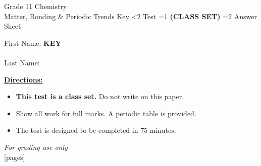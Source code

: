\documentclass[addpoints]{exam}
\newcommand{\event}{Matter, Bonding \& Periodic Trends}
\newcommand{\tournament}{}
\def\type{0}
\begin{document}
\begin{center}
    {\huge Grade 11 Chemistry \\ \event
    \ifprintanswers \space Key
    \else \space \ifnum\type<2 Test \fi \ifnum\type=1 \textbf{(CLASS SET)} \fi
          \ifnum\type=2 Answer Sheet \fi
    \fi \\ \vspace{3mm}\tournament\vspace{1mm}}
\end{center}

\vspace{.25\textheight}

\begin{center}
    First Name: \ifprintanswers
    \underline{\hspace{3.5cm}}\textbf{KEY}\underline{\hspace{5.5cm}}\\\vspace{5mm}
    \else \underline{\hspace{10cm}}\\ \vspace{5mm} \fi
    Last Name: \underline{\hspace{10cm}}\\ \vspace{5mm}
\end{center}

\noindent\textbf{\underline{Directions:}}
\begin{itemize}
    \ifnum\type=1 \item \textbf{This test is a class set.} Do not write on this paper. \fi
    \item Show all work for full marks. A periodic table is provided.
    \item The test is designed to be completed in 75 minutes.
\end{itemize}
\begin{center}
\textit{For grading use only}\\
[pages]
\end{center}
\end{document}
